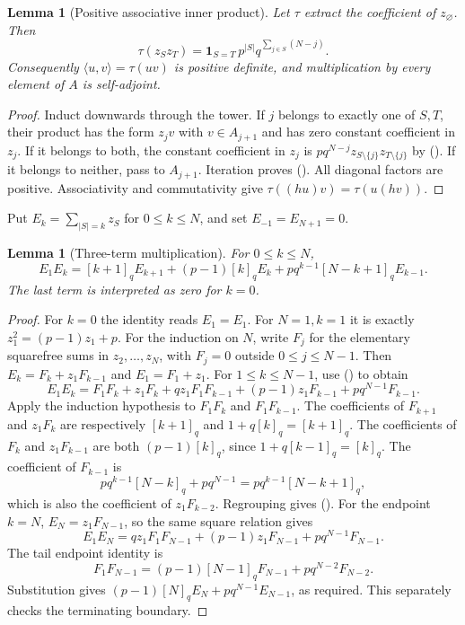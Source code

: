 \documentclass[twoside,10pt]{article}
\numberwithin{equation}{section}
\theoremstyle{slbody}
\newtheorem{lemma}[theorem]{Lemma}
\theoremstyle{definition}
\theoremstyle{remark}
\renewcommand{\eqref}[1]{\textup{{\normalfont(\oldstylenums{\ref{#1}}}\normalfont)}}
\begin{document}
\begin{lemma}[Positive associative inner product]\label{lem:trace}
Let $\tau$ extract the coefficient of $z_\varnothing$. Then
\begin{equation}\label{eq:trace}
\tau(z_Sz_T)=\boldsymbol1_{S=T}\,p^{|S|}q^{\sum_{j\in S}(N-j)}.
\end{equation}
Consequently $\langle u,v\rangle=\tau(uv)$ is positive definite, and multiplication by every element of $A$ is self-adjoint.
\end{lemma}
\begin{proof}
Induct downwards through the tower. If $j$ belongs to exactly one of $S,T$, their product has the form $z_jv$ with $v\in A_{j+1}$ and has zero constant coefficient in $z_j$. If it belongs to both, the constant coefficient in $z_j$ is $pq^{N-j}z_{S\setminus\{j\}}z_{T\setminus\{j\}}$ by \eqref{eq:algebra}. If it belongs to neither, pass to $A_{j+1}$. Iteration proves \eqref{eq:trace}. All diagonal factors are positive. Associativity and commutativity give $\tau((hu)v)=\tau(u(hv))$.
\end{proof}

Put $E_k=\sum_{|S|=k}z_S$ for $0\leq k\leq N$, and set $E_{-1}=E_{N+1}=0$.

\begin{lemma}[Three-term multiplication]\label{lem:three}
For $0\leq k\leq N$,
\begin{equation}\label{eq:three}
E_1E_k=[k+1]_qE_{k+1}+(p-1)[k]_qE_k+
pq^{k-1}[N-k+1]_qE_{k-1}.
\end{equation}
The last term is interpreted as zero for $k=0$.
\end{lemma}
\begin{proof}
For $k=0$ the identity reads $E_1=E_1$. For $N=1,k=1$ it is exactly $z_1^2=(p-1)z_1+p$.
For the induction on $N$, write $F_j$ for the elementary squarefree sums in $z_2,\ldots,z_N$, with $F_j=0$ outside $0\leq j\leq N-1$. Then $E_k=F_k+z_1F_{k-1}$ and $E_1=F_1+z_1$. For $1\leq k\leq N-1$, use \eqref{eq:algebra} to obtain
\[
E_1E_k=F_1F_k+z_1F_k+qz_1F_1F_{k-1}
 +(p-1)z_1F_{k-1}+pq^{N-1}F_{k-1}.
\]
Apply the induction hypothesis to $F_1F_k$ and $F_1F_{k-1}$. The coefficients of $F_{k+1}$ and $z_1F_k$ are respectively $[k+1]_q$ and $1+q[k]_q=[k+1]_q$. The coefficients of $F_k$ and $z_1F_{k-1}$ are both $(p-1)[k]_q$, since $1+q[k-1]_q=[k]_q$. The coefficient of $F_{k-1}$ is
\[
pq^{k-1}[N-k]_q+pq^{N-1}=pq^{k-1}[N-k+1]_q,
\]
which is also the coefficient of $z_1F_{k-2}$. Regrouping gives \eqref{eq:three}.
For the endpoint $k=N$, $E_N=z_1F_{N-1}$, so the same square relation gives
\[
E_1E_N=qz_1F_1F_{N-1}+(p-1)z_1F_{N-1}+pq^{N-1}F_{N-1}.
\]
The tail endpoint identity is
\[
F_1F_{N-1}=(p-1)[N-1]_qF_{N-1}+pq^{N-2}F_{N-2}.
\]
Substitution gives $(p-1)[N]_qE_N+pq^{N-1}E_{N-1}$, as required. This separately checks the terminating boundary.
\end{proof}
\end{document}
